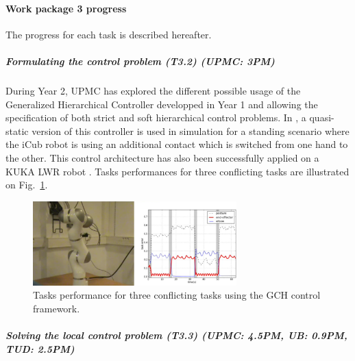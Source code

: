  
\paragraph{Work package 3 progress}

The progress for each task is described hereafter.

\subparagraph{Formulating the control problem (T3.2) (UPMC: 3PM)}

During Year 2, UPMC has explored the different possible usage of the Generalized Hierarchical Controller developped in Year 1 \cite{LiuGHC} and allowing the specification of both strict and soft hierarchical control problems. In \cite{LiuAutRobSpecIssue}, a quasi-static version of this controller is used in simulation for a standing scenario where the iCub robot is using an additional contact which is switched from one hand to the other. This control architecture has also been successfully applied on a KUKA LWR robot \cite{LiuICRA2015}. Tasks performances for three conflicting tasks are illustrated on Fig.~\ref{fig:KUKA_LWR_GHC}.

\begin{figure}[h]
\centering
\includegraphics[width=0.7\textwidth]{images/KUKA_GHC_ICRA}
\caption{Tasks performance for three conflicting tasks using the GCH control framework.}
\label{fig:KUKA_LWR_GHC}
\end{figure}

\subparagraph{Solving the local control problem (T3.3) (UPMC: 4.5PM, UB: 0.9PM, TUD: 2.5PM)}

